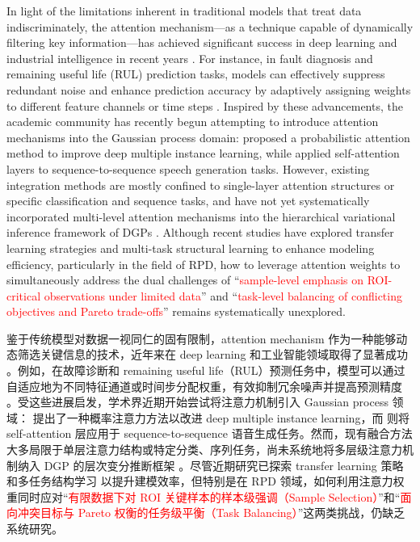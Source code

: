 \documentclass[11pt]{article}
\begin{document}
In light of the limitations inherent in traditional models that treat data indiscriminately, the attention mechanism—as a technique capable of dynamically filtering key information—has achieved significant success in deep learning and industrial intelligence in recent years \citep{Cho2024, Guo2025}. For instance, in fault diagnosis and remaining useful life (RUL) prediction tasks, models can effectively suppress redundant noise and enhance prediction accuracy by adaptively assigning weights to different feature channels or time steps \citep{Fan2025, Ma2025}. Inspired by these advancements, the academic community has recently begun attempting to introduce attention mechanisms into the Gaussian process domain: \cite{Schmidt2024} proposed a probabilistic attention method to improve deep multiple instance learning, while \cite{Nakamura2021} applied self-attention layers to sequence-to-sequence speech generation tasks. 
However, existing integration methods are mostly confined to single-layer attention structures or specific classification and sequence tasks, and have not yet systematically incorporated multi-level attention mechanisms into the hierarchical variational inference framework of DGPs \citep{Booth2025}.  Although recent studies have explored transfer learning strategies \citep{Yao2026} and multi-task structural learning \citep{Yang2025} to enhance modeling efficiency,  particularly in the field of RPD, how to leverage attention weights to simultaneously address the dual challenges of ``\textcolor{red}{sample-level emphasis on ROI-critical observations under limited data}'' and ``\textcolor{red}{task-level balancing of conflicting objectives and Pareto trade-offs}'' remains systematically unexplored.

鉴于传统模型对数据一视同仁的固有限制，attention mechanism 作为一种能够动态筛选关键信息的技术，近年来在 deep learning 和工业智能领域取得了显著成功 \citep{Cho2024, Guo2025}。例如，在故障诊断和 remaining useful life（RUL）预测任务中，模型可以通过自适应地为不同特征通道或时间步分配权重，有效抑制冗余噪声并提高预测精度 \citep{Fan2025, Ma2025}。受这些进展启发，学术界近期开始尝试将注意力机制引入 Gaussian process 领域：\cite{Schmidt2024} 提出了一种概率注意力方法以改进 deep multiple instance learning，而 \cite{Nakamura2021} 则将 self-attention 层应用于 sequence-to-sequence 语音生成任务。然而，现有融合方法大多局限于单层注意力结构或特定分类、序列任务，尚未系统地将多层级注意力机制纳入 DGP 的层次变分推断框架 \citep{Booth2025}。尽管近期研究已探索 transfer learning 策略 \citep{Yao2026} 和多任务结构学习 \citep{Yang2025} 以提升建模效率，但特别是在 RPD 领域，如何利用注意力权重同时应对“\textcolor{red}{有限数据下对 ROI 关键样本的样本级强调（Sample Selection）}”和“\textcolor{red}{面向冲突目标与 Pareto 权衡的任务级平衡（Task Balancing）}”这两类挑战，仍缺乏系统研究。
\end{document}
